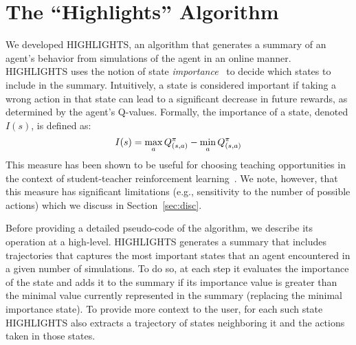 \section{The ``Highlights'' Algorithm}
\label{sec:alg}
We developed HIGHLIGHTS, an algorithm that generates a summary of an agent's behavior from simulations of the agent in an online manner. HIGHLIGHTS uses the notion of state \emph{importance}~\cite{torrey2013teaching} to decide which states to include in the summary.  Intuitively, a state is considered important if taking a wrong action in that state can lead to a significant decrease in future rewards, as determined by the agent's Q-values. Formally, the importance of a state, denoted $I(s)$, is defined as: 
\begin{equation}
\label{eq:importance}
I(s)=\max\limits_{a}Q^{\pi}_{(s,a)}-\min\limits_{a}Q^{\pi}_{(s,a)}
\vspace{-0.1cm}
\end{equation}
 This measure has been shown to be useful for choosing teaching opportunities in the context of student-teacher reinforcement learning~\cite{torrey2013teaching,amirIjcaiRL}. We note, however, that this measure has significant limitations (e.g., sensitivity to the number of possible actions) which we discuss in Section~\ref{sec:disc}.

Before providing a detailed pseudo-code of the algorithm, we describe its operation at a high-level. HIGHLIGHTS generates a summary that includes trajectories that captures the most important states that an agent encountered in a given number of simulations. To do so, at each step it evaluates the importance of the state and adds it to the summary if its importance value is greater than the minimal value currently represented in the summary (replacing the minimal importance state). To provide more context to the user,  for each such state HIGHLIGHTS also extracts a trajectory of states neighboring it and the actions taken in those states.


